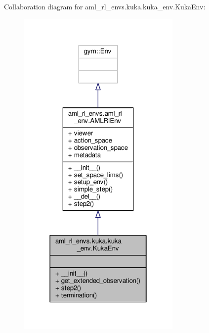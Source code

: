 Collaboration diagram for aml\-\_\-rl\-\_\-envs.\-kuka.\-kuka\-\_\-env.\-Kuka\-Env\-:
\nopagebreak
\begin{figure}[H]
\begin{center}
\leavevmode
\includegraphics[width=226pt]{classaml__rl__envs_1_1kuka_1_1kuka__env_1_1_kuka_env__coll__graph}
\end{center}
\end{figure}
